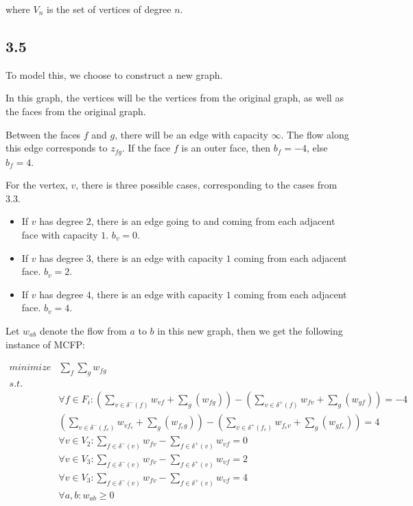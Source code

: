 \documentclass[11pt,a4paper]{article}
\begin{document}
where $V_n$ is the set of vertices of degree $n$.

\subsection{3.5}
To model this, we choose to construct a new graph.

In this graph, the vertices will be the vertices from the original graph, as
well as the faces from the original graph.

Between the faces $f$ and $g$, there will be an edge with capacity
$\infty$. The flow along this edge corresponds to $z_{fg}$.
If the face $f$ is an outer face, then $b_f = -4$, else $b_f = 4$.

For the vertex, $v$, there is three possible cases, corresponding to the cases from
3.3.

\begin{itemize}
    \item If $v$ has degree $2$, there is an edge going to and coming from each adjacent face
          with capacity $1$. $b_v = 0$.
    \item If $v$ has degree $3$, there is an edge with capacity $1$ coming from each adjacent face.
          $b_v = 2$.
    \item If $v$ has degree $4$, there is an edge with capacity $1$ coming from each adjacent face.
          $b_v = 4$.
\end{itemize}

Let $w_{ab}$ denote the flow from $a$ to $b$ in this new graph, then we get the following instance of MCFP:

\begin{align*}
    minimize & \sum_f \sum_g w_{fg} \\
    s.t.     & \\
             & \forall f \in F_i: \left(\sum_{v \in \delta^-(f)} w_{vf} + \sum_g (w_{fg})\right) - \left(\sum_{v \in \delta^+(f)} w_{fv} + \sum_g (w_{gf})\right) = -4 \\
             & \left(\sum_{v \in \delta^-(f_e)} w_{vf_e} + \sum_g (w_{f_eg})\right) - \left(\sum_{v \in \delta^+(f_e)} w_{f_ev} + \sum_g (w_{gf_e})\right) = 4 \\
             & \forall v \in V_2: \sum_{f \in \delta^-(v)} w_{fv} - \sum_{f \in \delta^+(v)} w_{vf} = 0 \\
             & \forall v \in V_3: \sum_{f \in \delta^-(v)} w_{fv} - \sum_{f \in \delta^+(v)} w_{vf} = 2 \\
             & \forall v \in V_3: \sum_{f \in \delta^-(v)} w_{fv} - \sum_{f \in \delta^+(v)} w_{vf} = 4 \\
             & \forall a, b: w_{ab} \geq 0 
\end{align*}



\end{document}
